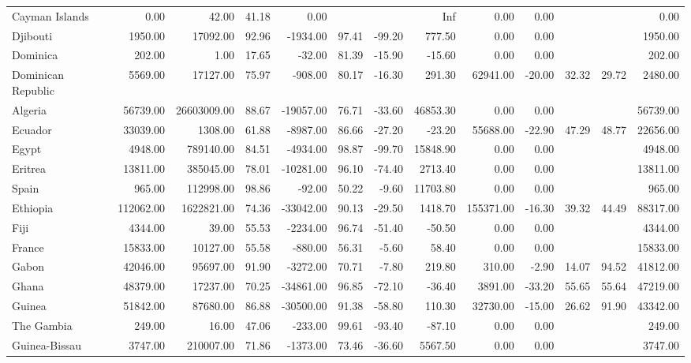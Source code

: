\begin{table}[ht]
\begin{tabular}{lrrrrrrrrrrrr}
  Cayman Islands & 0.00 & 42.00 & 41.18 & 0.00 &  &  & Inf & 0.00 & 0.00 &  &  & 0.00 \\ 
  Djibouti & 1950.00 & 17092.00 & 92.96 & -1934.00 & 97.41 & -99.20 & 777.50 & 0.00 & 0.00 &  &  & 1950.00 \\ 
  Dominica & 202.00 & 1.00 & 17.65 & -32.00 & 81.39 & -15.90 & -15.60 & 0.00 & 0.00 &  &  & 202.00 \\ 
  Dominican Republic & 5569.00 & 17127.00 & 75.97 & -908.00 & 80.17 & -16.30 & 291.30 & 62941.00 & -20.00 & 32.32 & 29.72 & 2480.00 \\ 
  Algeria & 56739.00 & 26603009.00 & 88.67 & -19057.00 & 76.71 & -33.60 & 46853.30 & 0.00 & 0.00 &  &  & 56739.00 \\ 
  Ecuador & 33039.00 & 1308.00 & 61.88 & -8987.00 & 86.66 & -27.20 & -23.20 & 55688.00 & -22.90 & 47.29 & 48.77 & 22656.00 \\ 
  Egypt & 4948.00 & 789140.00 & 84.51 & -4934.00 & 98.87 & -99.70 & 15848.90 & 0.00 & 0.00 &  &  & 4948.00 \\ 
  Eritrea & 13811.00 & 385045.00 & 78.01 & -10281.00 & 96.10 & -74.40 & 2713.40 & 0.00 & 0.00 &  &  & 13811.00 \\ 
  Spain & 965.00 & 112998.00 & 98.86 & -92.00 & 50.22 & -9.60 & 11703.80 & 0.00 & 0.00 &  &  & 965.00 \\ 
  Ethiopia & 112062.00 & 1622821.00 & 74.36 & -33042.00 & 90.13 & -29.50 & 1418.70 & 155371.00 & -16.30 & 39.32 & 44.49 & 88317.00 \\ 
  Fiji & 4344.00 & 39.00 & 55.53 & -2234.00 & 96.74 & -51.40 & -50.50 & 0.00 & 0.00 &  &  & 4344.00 \\ 
  France & 15833.00 & 10127.00 & 55.58 & -880.00 & 56.31 & -5.60 & 58.40 & 0.00 & 0.00 &  &  & 15833.00 \\ 
  Gabon & 42046.00 & 95697.00 & 91.90 & -3272.00 & 70.71 & -7.80 & 219.80 & 310.00 & -2.90 & 14.07 & 94.52 & 41812.00 \\ 
  Ghana & 48379.00 & 17237.00 & 70.25 & -34861.00 & 96.85 & -72.10 & -36.40 & 3891.00 & -33.20 & 55.65 & 55.64 & 47219.00 \\ 
  Guinea & 51842.00 & 87680.00 & 86.88 & -30500.00 & 91.38 & -58.80 & 110.30 & 32730.00 & -15.00 & 26.62 & 91.90 & 43342.00 \\ 
  The Gambia & 249.00 & 16.00 & 47.06 & -233.00 & 99.61 & -93.40 & -87.10 & 0.00 & 0.00 &  &  & 249.00 \\ 
  Guinea-Bissau & 3747.00 & 210007.00 & 71.86 & -1373.00 & 73.46 & -36.60 & 5567.50 & 0.00 & 0.00 &  &  & 3747.00 \\ 

\end{tabular}
\end{table}
